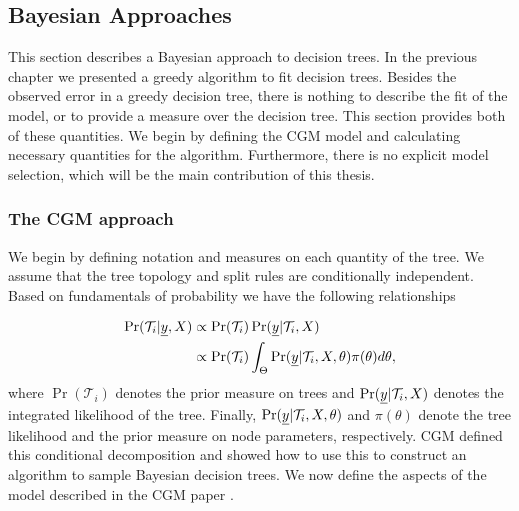 \subsection{Bayesian Approaches}
\label{ch:p2sub_bayes}

This section describes a Bayesian approach to decision trees. In the previous chapter we presented a greedy algorithm to fit decision trees. Besides the observed error in a greedy decision tree, there is nothing to describe the fit of the model, or to  provide a measure over the decision tree. This section provides both of these quantities. We begin by defining the CGM model and calculating necessary quantities for the algorithm. Furthermore, there is no explicit model selection, which will be the main contribution of this thesis.    

\subsubsection{The CGM approach}
We begin by defining notation and measures on each quantity of the tree. 
We assume that the tree topology and split rules are conditionally independent. Based on fundamentals of probability we have the following relationships

\begin{align}
 \Pr(\mathcal{T}_i \vert \underline{y}, X ) &\propto \Pr(\mathcal{T}_i)\Pr(\underline{y} \vert \mathcal{T}_i, X)\nonumber \\
  &\propto \Pr(\mathcal{T}_i)\int_{\Theta}\Pr(\underline{y} \vert \mathcal{T}_i, X, \theta)\pi(\theta)d\theta,
\end{align}
where $\Pr(\mathcal{T}_i)$ denotes the prior measure on trees and $\Pr(\underline{y} \vert \mathcal{T}_i, X)$ denotes the integrated likelihood of the tree. Finally, $\Pr(\underline{y} \vert \mathcal{T}_i, X, \theta)$ and $\pi(\theta)$ denote the tree likelihood and the prior measure on node parameters, respectively. CGM \cite{chipman1998bayesian} defined this  conditional decomposition and showed how to use this to construct an algorithm to sample Bayesian decision trees. We now define the aspects of the model described in the CGM paper \cite{chipman1998bayesian}. 

